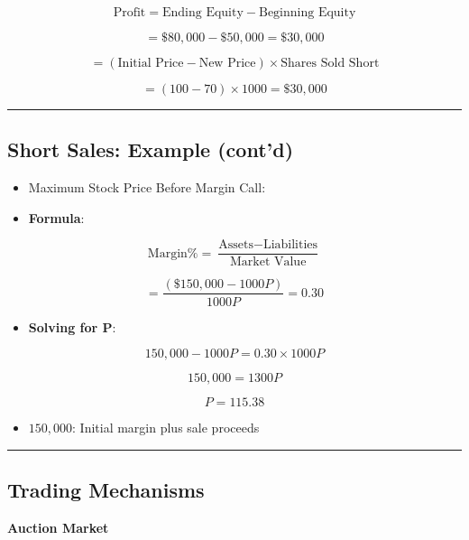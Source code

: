 \documentclass[
  letterpaper,
  DIV=11,
  numbers=noendperiod]{scrartcl}
\providecommand{\tightlist}{%
  \setlength{\itemsep}{0pt}\setlength{\parskip}{0pt}}\usepackage{longtable,booktabs,array}
\begin{document}
\[\text{Profit} = \text{Ending Equity} - \text{Beginning Equity}\]

\[= \$80,000 - \$50,000 = \$30,000\]

\[= (\text{Initial Price} - \text{New Price}) \times \text{Shares Sold Short}\]

\[= (100 - 70) \times 1000 = \$30,000\]

\begin{center}\rule{0.5\linewidth}{0.5pt}\end{center}

\subsection{Short Sales: Example
(cont'd)}\label{short-sales-example-contd-1}

\begin{itemize}
\tightlist
\item
  Maximum Stock Price Before Margin Call:
\item
  \textbf{Formula}:
\end{itemize}

\[\text{Margin%
\]

\[= \frac{(\$150,000 - 1000P)}{1000P} = 0.30\]

\begin{itemize}
\tightlist
\item
  \textbf{Solving for P}:
\end{itemize}

\[150,000 - 1000P = 0.30 \times 1000P\]

\[150,000 = 1300P\]

\[P = 115.38\]

\begin{itemize}
\tightlist
\item
  \(150,000\): Initial margin plus sale proceeds
\end{itemize}

\begin{center}\rule{0.5\linewidth}{0.5pt}\end{center}

\subsection{Trading Mechanisms}\label{trading-mechanisms}

\textbf{Auction Market}
\end{document}
